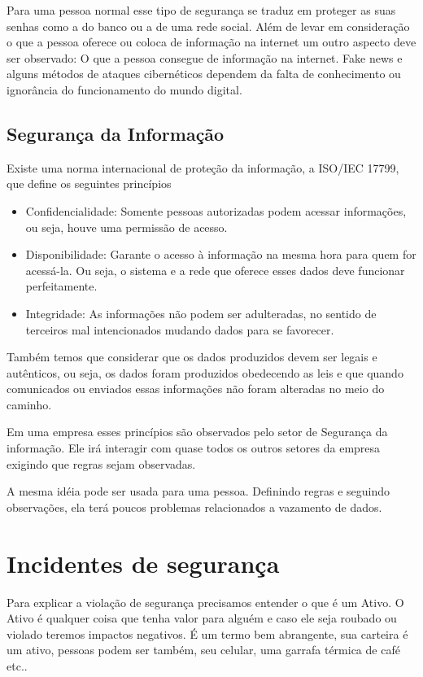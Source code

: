 Para uma pessoa normal esse tipo de segurança se traduz em proteger as suas senhas como a do banco ou a de uma rede social. Além de levar em consideração o que a pessoa oferece ou coloca de informação na internet um outro aspecto deve ser observado: O que a pessoa consegue de informação na internet. Fake news e alguns métodos de ataques cibernéticos dependem da falta de conhecimento ou ignorância do funcionamento do mundo digital.


\subsection{Segurança da Informação}

Existe uma norma internacional de proteção da informação, a ISO/IEC 17799, que define os seguintes princípios

\begin{itemize}
    \item Confidencialidade: Somente pessoas autorizadas podem acessar informações, ou seja, houve uma permissão de acesso.
    \item Disponibilidade: Garante o acesso à informação na mesma hora para quem for acessá-la. Ou seja, o sistema e a rede que oferece esses dados deve funcionar perfeitamente.
    \item Integridade: As informações não podem ser adulteradas, no sentido de terceiros mal intencionados mudando dados para se favorecer.
\end{itemize}

Também temos que considerar que os dados produzidos devem ser legais e autênticos, ou seja, os dados foram produzidos obedecendo as leis e que quando comunicados ou enviados essas informações não foram alteradas no meio do caminho.

Em uma empresa esses princípios são observados pelo setor de Segurança da informação. Ele irá interagir com quase todos os outros setores da empresa exigindo que regras sejam observadas.

A mesma idéia pode ser usada para uma pessoa. Definindo regras e seguindo observações, ela terá poucos problemas relacionados a vazamento de dados.


\section{Incidentes de segurança}

Para explicar a violação de segurança precisamos entender o que é um Ativo. O Ativo é qualquer coisa que tenha valor para alguém e caso ele seja roubado ou violado teremos impactos negativos. É um termo bem abrangente, sua carteira é um ativo, pessoas podem ser também, seu celular, uma garrafa térmica de café etc..

